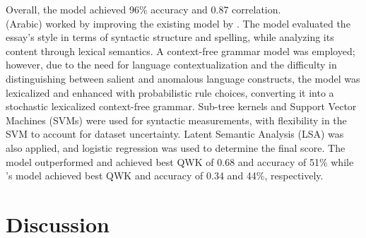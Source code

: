 \documentclass{article}
\begin{document}
	Overall, the model achieved 96\% accuracy and 0.87 correlation. \\
	\textbf{\textcite{26_alsanie2022threelevels}} (Arabic) worked by improving the existing model by \textcite{6_ghamdi2014hybridarabic}. The model evaluated the essay’s style in terms of syntactic structure and spelling, while analyzing its content through lexical semantics. A context-free grammar model was employed; however, due to the need for language contextualization and the difficulty in distinguishing between salient and anomalous language constructs, the model was lexicalized and enhanced with probabilistic rule choices, converting it into a stochastic lexicalized context-free grammar. Sub-tree kernels and Support Vector Machines (SVMs) were used for syntactic measurements, with flexibility in the SVM to account for dataset uncertainty. Latent Semantic Analysis (LSA) was also applied, and logistic regression was used to determine the final score. The model outperformed \textcite{6_ghamdi2014hybridarabic} and achieved best QWK of 0.68 and accuracy of 51\% while \textcite{6_ghamdi2014hybridarabic}'s model achieved best QWK and accuracy of 0.34 and 44\%, respectively.

	
	\section{Discussion}
	
	\begin{center}
	\end{center}
	
\end{document}
